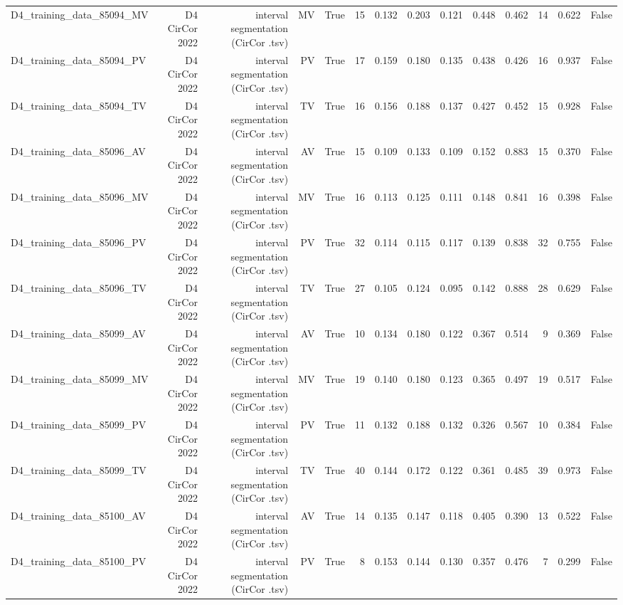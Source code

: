 \begin{table}[htbp]
\begin{tabular}{lrrrrrrrrrrrrr}
    D4\_training\_data\_85094\_MV & D4 CirCor 2022 & interval segmentation (CirCor .tsv) & MV & True & 15 & 0.132 & 0.203 & 0.121 & 0.448 & 0.462 & 14 & 0.622 & False \\
    D4\_training\_data\_85094\_PV & D4 CirCor 2022 & interval segmentation (CirCor .tsv) & PV & True & 17 & 0.159 & 0.180 & 0.135 & 0.438 & 0.426 & 16 & 0.937 & False \\
    D4\_training\_data\_85094\_TV & D4 CirCor 2022 & interval segmentation (CirCor .tsv) & TV & True & 16 & 0.156 & 0.188 & 0.137 & 0.427 & 0.452 & 15 & 0.928 & False \\
    D4\_training\_data\_85096\_AV & D4 CirCor 2022 & interval segmentation (CirCor .tsv) & AV & True & 15 & 0.109 & 0.133 & 0.109 & 0.152 & 0.883 & 15 & 0.370 & False \\
    D4\_training\_data\_85096\_MV & D4 CirCor 2022 & interval segmentation (CirCor .tsv) & MV & True & 16 & 0.113 & 0.125 & 0.111 & 0.148 & 0.841 & 16 & 0.398 & False \\
    D4\_training\_data\_85096\_PV & D4 CirCor 2022 & interval segmentation (CirCor .tsv) & PV & True & 32 & 0.114 & 0.115 & 0.117 & 0.139 & 0.838 & 32 & 0.755 & False \\
    D4\_training\_data\_85096\_TV & D4 CirCor 2022 & interval segmentation (CirCor .tsv) & TV & True & 27 & 0.105 & 0.124 & 0.095 & 0.142 & 0.888 & 28 & 0.629 & False \\
    D4\_training\_data\_85099\_AV & D4 CirCor 2022 & interval segmentation (CirCor .tsv) & AV & True & 10 & 0.134 & 0.180 & 0.122 & 0.367 & 0.514 & 9 & 0.369 & False \\
    D4\_training\_data\_85099\_MV & D4 CirCor 2022 & interval segmentation (CirCor .tsv) & MV & True & 19 & 0.140 & 0.180 & 0.123 & 0.365 & 0.497 & 19 & 0.517 & False \\
    D4\_training\_data\_85099\_PV & D4 CirCor 2022 & interval segmentation (CirCor .tsv) & PV & True & 11 & 0.132 & 0.188 & 0.132 & 0.326 & 0.567 & 10 & 0.384 & False \\
    D4\_training\_data\_85099\_TV & D4 CirCor 2022 & interval segmentation (CirCor .tsv) & TV & True & 40 & 0.144 & 0.172 & 0.122 & 0.361 & 0.485 & 39 & 0.973 & False \\
    D4\_training\_data\_85100\_AV & D4 CirCor 2022 & interval segmentation (CirCor .tsv) & AV & True & 14 & 0.135 & 0.147 & 0.118 & 0.405 & 0.390 & 13 & 0.522 & False \\
    D4\_training\_data\_85100\_PV & D4 CirCor 2022 & interval segmentation (CirCor .tsv) & PV & True & 8 & 0.153 & 0.144 & 0.130 & 0.357 & 0.476 & 7 & 0.299 & False \\

\end{tabular}
\end{table}
